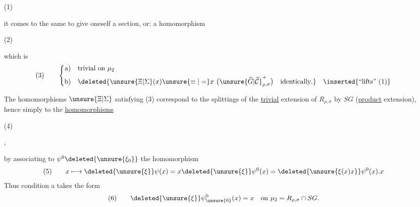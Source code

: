 \begin{samepage}
\noindent (1)\quad
{}
\end{samepage}


it comes to the same to give oneself a section,
or: a homomorphism

\begin{samepage}
\noindent (2)\quad
{}
\end{samepage}

which is 
\[
\text{(3)}\qquad
\left\{\begin{aligned}
\text{a)}\quad &\text{trivial on }\mu_2\\
\text{b)}\quad &\deleted{\unsure{\Xi|\Sigma}(x)\unsure{\equiv|=}x\ \bigl(\unsure{\widetilde G|\widetilde{\mathcal C}}^+_{\rho,\sigma}\bigr)\quad\text{identically}.}\quad\inserted{\text{``lifts'' (1)}}
\end{aligned}\right.
\]

The homomorphisms $\unsure{\Xi|\Sigma}$ satisfying (3) correspond
to the splittings of the \uline{trivial} extension of
$R_{\rho,\sigma}$ by $SG$ (\uline{product} extension), hence
simply to the \uline{homomorphisms}

\begin{samepage}
\noindent (4)\quad
{}
\end{samepage},



by associating to $\psi^0\deleted{\unsure{\xi_0}}$ the homomorphism
\[
(5)\qquad x\longmapsto \deleted{\unsure{\xi}}\psi(x)
=x\deleted{\unsure{\xi}}\psi^0(x)
=\deleted{\unsure{\xi(x)x}}\psi^0(x).x
\]
Thus condition a takes the form
\[
(6)\qquad \deleted{\unsure{\xi}}\psi^0_{\unsure{0}}(x)=x
\quad\text{on }\mu_2=R_{\rho,\sigma}\cap SG.
\]

